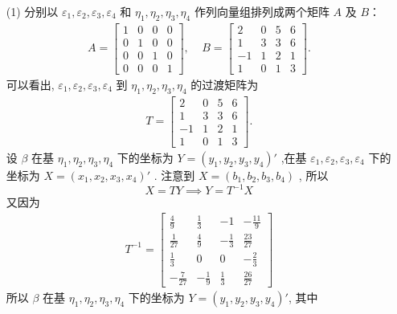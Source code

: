 \documentclass[11pt,a4paper,openany,oneside]{book}
\begin{document}
\begin{enumerate}
\item[(1)]  
 分别以 $ \varepsilon_1, \varepsilon_2, \varepsilon_3, \varepsilon_4 $ 和 $ \eta_1, \eta_2, \eta_3, \eta_4 $ 作列向量组排列成两个矩阵 $A$ 及 $B$：
\begin{gather*}
A = 
\begin{bmatrix}
1  &  0  &  0  &  0  \\
0  &  1  &  0  &  0  \\
0  &  0  &  1  &  0  \\
0  &  0  &  0  &  1  
\end{bmatrix},
\ \ \ \ \ 
B=
\begin{bmatrix}
2  &  0  &  5  &  6  \\
1  &  3  &  3  &  6  \\
-1 &  1  &  2  &  1  \\
1  &  0  &  1  &  3  
\end{bmatrix}.
\end{gather*}
可以看出,  $ \varepsilon_1, \varepsilon_2, \varepsilon_3, \varepsilon_4 $ 到 $ \eta_1, \eta_2, \eta_3, \eta_4 $ 的过渡矩阵为
\begin{gather*}
T = 
\begin{bmatrix}
2  &  0  &  5  &  6  \\
1  &  3  &  3  &  6  \\
-1 &  1  &  2  &  1  \\
1  &  0  &  1  &  3  
\end{bmatrix}.
\end{gather*}
设 $ \beta $ 在基 $ \eta_1, \eta_2, \eta_3, \eta_4 $ 下的坐标为 $ Y=(y_1, y_2, y_3, y_4)' $ ,在基 $ \varepsilon_1, \varepsilon_2, \varepsilon_3, \varepsilon_4 $ 下的坐标为 $ X=(x_1, x_2, x_3, x_4)' $ . 注意到 $ X=(b_1, b_2, b_3, b_4) $ , 所以
 $$ X = TY \implies Y = T^{-1}X $$ 
又因为
\begin{gather*}
T^{-1} = 
\left[\begin{array}{rrrr}
\frac{4}{9}  &  \frac{1}{3}  &  -1  &  -\frac{11}{9} \\
\frac{1}{27} &  \frac{4}{9}  &  -\frac{1}{3} & \frac{23}{27} \\
\frac{1}{3}  &  0             &     0          &  -\frac{2}{3}  \\
-\frac{7}{27} & -\frac{1}{9} &  \frac{1}{3}  &  \frac{26}{27}
\end{array} \right]
\end{gather*}
所以 $ \beta $ 在基 $ \eta_1, \eta_2, \eta_3, \eta_4 $ 下的坐标为 $ Y=(y_1, y_2, y_3, y_4)' $, 其中


\end{enumerate}
\end{document}
